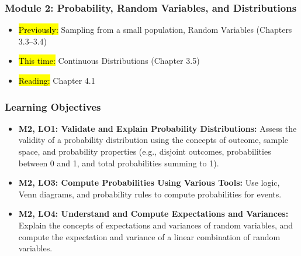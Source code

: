 
\begin{frame}
    \frametitle{Module 2: Probability, Random Variables, and Distributions}
    \begin{itemize}
        \item \hl{Previously: }Sampling from a small population, Random Variables (Chapters 3.3--3.4)
        \item \hl{This time: }Continuous Distributions (Chapter 3.5)
        \item \hl{Reading: }Chapter 4.1
    \end{itemize}

\end{frame}
\begin{frame}
    \frametitle{Learning Objectives}
    \begin{itemize}
        \item \textbf{M2, LO1: Validate and Explain Probability Distributions:} Assess the validity of a probability distribution using the concepts of outcome, sample space, and probability properties (e.g., disjoint outcomes, probabilities between 0 and 1, and total probabilities summing to 1).
        \item \textbf{M2, LO3: Compute Probabilities Using Various Tools:} Use logic, Venn diagrams, and probability rules to compute probabilities for events.
        \item \textbf{M2, LO4: Understand and Compute Expectations and Variances:} Explain the concepts of expectations and variances of random variables, and compute the expectation and variance of a linear combination of random variables.
    \end{itemize}
\end{frame}

